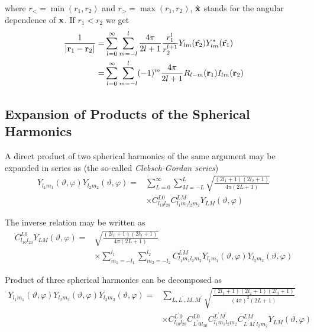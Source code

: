 where $r_<=\min (r_1,r_2)$ and $r_>=\max (r_1,r_2)$, $\hat{\bf x}$ stands for
the angular dependence of ${\bf x}$. If $r_1<r_2$ we get
\begin{equation}
\begin{split}
\frac{1}{|{\bf r}_1-{\bf r}_2|}=&\sum_{l=0}^{\infty}\sum_{m=-l}^{l}\frac{4 \pi}{2l+1}\frac{r_1^l}{r_2^{l+1}}Y_{lm}(\hat{{\bf r}_2})Y_{lm}^{*}(\hat{{\bf r}_1})\\=&\sum_{l=0}^{\infty}\sum_{m=-l}^{l}(-1)^m\frac{4 \pi}{2l+1}R_{l-m}({\bf r}_1)I_{lm}({\bf r}_2)
\end{split}
\end{equation}
%
\subsection[Expansion of Products...]{Expansion of Products of the Spherical Harmonics}
\par{A direct product of two spherical harmonics of the same argument may be
  expanded in series as (the so-called {\it Clebsch-Gordan series})}
\begin{equation}
\label{product2}
\begin{split}
Y_{l_1m_1}(\vartheta,\varphi)Y_{l_2m_2}(\vartheta,\varphi)=&\sum_{L=0}^{\infty}\sum_{M=-L}^{L}\sqrt{\frac{(2l_1+1)(2l_2+1)}{4\pi(2L+1)}}\\&\times C_{l_10l_20}^{L0}C_{l_1m_1l_2m_2}^{LM}Y_{LM}(\vartheta,\varphi)
\end{split}
\end{equation}
\par{The inverse relation may be written as}
\begin{equation}
\begin{split}
C_{l_10l_20}^{L0}Y_{LM}(\vartheta,\varphi)=&\sqrt{\frac{(2l_1+1)(2l_2+1)}{4\pi(2L+1)}}\\&\times\sum_{m_1=-l_1}^{l_1}\sum_{m_2=-l_2}^{l_2}C_{l_1m_1l_2m_2}^{LM}Y_{l_1m_1}(\vartheta,\varphi)Y_{l_2m_2}(\vartheta,\varphi)
\end{split}
\end{equation}
\par{Product of three spherical harmonics can be decomposed as}
\begin{equation*}
\begin{split}
Y_{l_1m_1}(\vartheta,\varphi)Y_{l_2m_2}(\vartheta,\varphi)Y_{l_3m_3}(\vartheta,\varphi)=&\sum_{L,L^{\prime},M,M^{\prime}}\sqrt{\frac{(2l_1+1)(2l_2+1)(2l_3+1)}{(4\pi)^2(2L+1)}}\\&\times C_{l_10l_20}^{L^{\prime}0}C_{L^{\prime}0l_30}^{L0}
C_{l_1m_1l_2m_2}^{L^{\prime}M^{\prime}}C_{L^{\prime}M^{\prime}l_2m_2}^{LM}Y_{LM}(\vartheta,\varphi)
\end{split}
\end{equation*}
